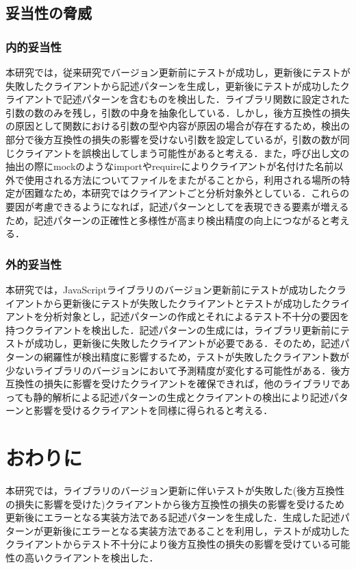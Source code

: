 \documentclass[11pt]{jreport}
\begin{document}
\section{妥当性の脅威}
\subsection{内的妥当性}
本研究では，従来研究でバージョン更新前にテストが成功し，更新後にテストが失敗したクライアントから記述パターンを生成し，更新後にテストが成功したクライアントで記述パターンを含むものを検出した．ライブラリ関数に設定された引数の数のみを残し，引数の中身を抽象化している．しかし，後方互換性の損失の原因として関数における引数の型や内容が原因の場合が存在するため，検出の部分で後方互換性の損失の影響を受けない引数を設定しているが，引数の数が同じクライアントを誤検出してしまう可能性があると考える．また，呼び出し文の抽出の際にmockのようなimportやrequireによりクライアントが名付けた名前以外で使用される方法についてファイルをまたがることから，利用される場所の特定が困難なため，本研究ではクライアントごと分析対象外としている．これらの要因が考慮できるようになれば，記述パターンとしてを表現できる要素が増えるため，記述パターンの正確性と多様性が高まり検出精度の向上につながると考える．


\subsection{外的妥当性}
本研究では，JavaScriptライブラリのバージョン更新前にテストが成功したクライアントから更新後にテストが失敗したクライアントとテストが成功したクライアントを分析対象とし，記述パターンの作成とそれによるテスト不十分の要因を持つクライアントを検出した．記述パターンの生成には，ライブラリ更新前にテストが成功し，更新後に失敗したクライアントが必要である．そのため，記述パターンの網羅性が検出精度に影響するため，テストが失敗したクライアント数が少ないライブラリのバージョンにおいて予測精度が変化する可能性がある．後方互換性の損失に影響を受けたクライアントを確保できれば，他のライブラリであっても静的解析による記述パターンの生成とクライアントの検出により記述パターンと影響を受けるクライアントを同様に得られると考える．

\chapter{おわりに}\label{sec:conclusion}

本研究では，ライブラリのバージョン更新に伴いテストが失敗した(後方互換性の損失に影響を受けた)クライアントから後方互換性の損失の影響を受けるため更新後にエラーとなる実装方法である記述パターンを生成した．生成した記述パターンが更新後にエラーとなる実装方法であることを利用し，テストが成功したクライアントからテスト不十分により後方互換性の損失の影響を受けている可能性の高いクライアントを検出した．
\end{document}
